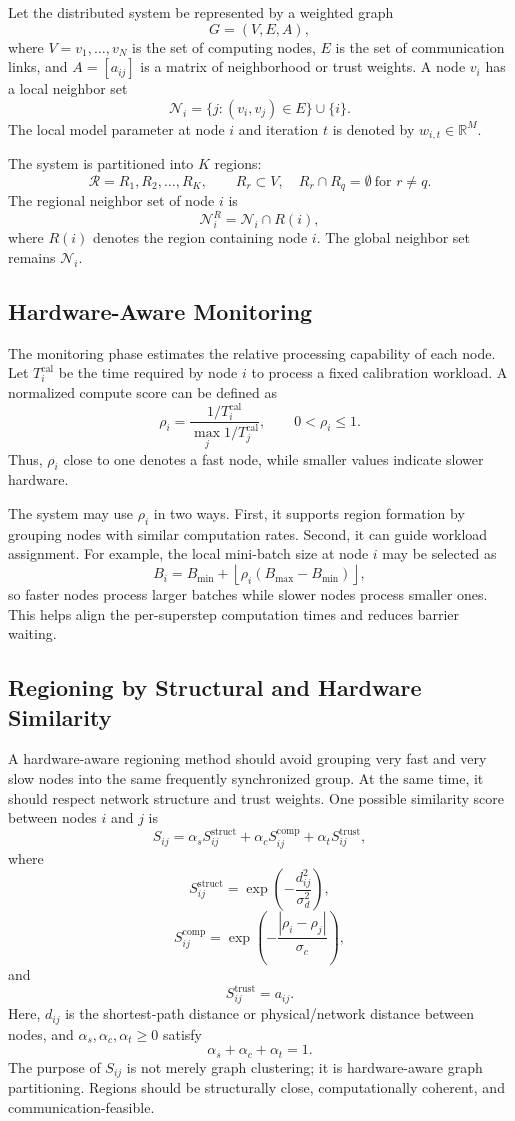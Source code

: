 ﻿\documentclass[10pt,journal]{IEEEtran}
\begin{document}
	Let the distributed system be represented by a weighted graph
	\[
	G=(V,E,A),
	\]
	where $V={v_1,\ldots,v_N}$ is the set of computing nodes, $E$ is the set of communication links, and $A=[a_{ij}]$ is a matrix of neighborhood or trust weights. A node $v_i$ has a local neighbor set
	\[
	\mathcal{N}_i=\{j:(v_i,v_j)\in E\}\cup\{i\}.
	\]
	The local model parameter at node $i$ and iteration $t$ is denoted by $w_{i,t}\in\mathbb{R}^M$.
	
	The system is partitioned into $K$ regions:
	\[
	\mathcal{R}={R_1,R_2,\ldots,R_K}, \qquad
	R_r \subset V, \quad R_r\cap R_q=\emptyset \ \text{for } r\ne q.
	\]
	The regional neighbor set of node $i$ is
	\[
	\mathcal{N}_i^R = \mathcal{N}_i \cap R(i),
	\]
	where $R(i)$ denotes the region containing node $i$. The global neighbor set remains $\mathcal{N}_i$.
	
	\subsection{Hardware-Aware Monitoring}
	
	The monitoring phase estimates the relative processing capability of each node. Let $T_i^{\mathrm{cal}}$ be the time required by node $i$ to process a fixed calibration workload. A normalized compute score can be defined as
	\[
	\rho_i
	=
	\frac{1/T_i^{\mathrm{cal}}}{\max_j 1/T_j^{\mathrm{cal}}},
	\qquad 0<\rho_i\leq 1.
	\]
	Thus, $\rho_i$ close to one denotes a fast node, while smaller values indicate slower hardware.
	
	The system may use $\rho_i$ in two ways. First, it supports region formation by grouping nodes with similar computation rates. Second, it can guide workload assignment. For example, the local mini-batch size at node $i$ may be selected as
	\[
	B_i = B_{\min} + \left\lfloor \rho_i(B_{\max}-B_{\min}) \right\rfloor,
	\]
	so faster nodes process larger batches while slower nodes process smaller ones. This helps align the per-superstep computation times and reduces barrier waiting.
	
	\subsection{Regioning by Structural and Hardware Similarity}
	
	A hardware-aware regioning method should avoid grouping very fast and very slow nodes into the same frequently synchronized group. At the same time, it should respect network structure and trust weights. One possible similarity score between nodes $i$ and $j$ is
	\[
	S_{ij}
	=
	\alpha_s S_{ij}^{\mathrm{struct}}
	+
	\alpha_c S_{ij}^{\mathrm{comp}}
	+
	\alpha_t S_{ij}^{\mathrm{trust}},
	\]
	where
	\[
	S_{ij}^{\mathrm{struct}}
	=
	\exp\left(-\frac{d_{ij}^2}{\sigma_d^2}\right),
	\]
	\[
	S_{ij}^{\mathrm{comp}}
	=
	\exp\left(-\frac{|\rho_i-\rho_j|}{\sigma_c}\right),
	\]
	and
	\[
	S_{ij}^{\mathrm{trust}}=a_{ij}.
	\]
	Here, $d_{ij}$ is the shortest-path distance or physical/network distance between nodes, and $\alpha_s,\alpha_c,\alpha_t\geq0$ satisfy
	\[
	\alpha_s+\alpha_c+\alpha_t=1.
	\]
	The purpose of $S_{ij}$ is not merely graph clustering; it is hardware-aware graph partitioning. Regions should be structurally close, computationally coherent, and communication-feasible.
	
\end{document}
